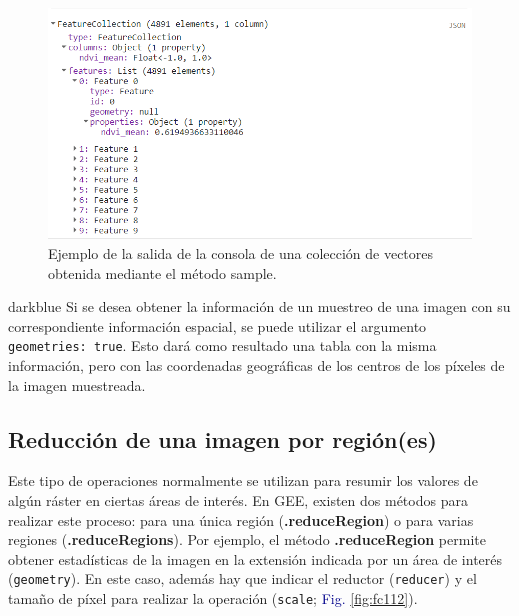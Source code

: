 \documentclass[
  12pt,
  letterpaper,
  twoside]{book}
\newcommand\boldpurple[1]{\textcolor{darkpurple}{\textbf{#1}}}
\begin{document}
\begin{figure}[H]

{\centering \includegraphics[width=0.95\linewidth]{Img/sampleRegions} 

}

\caption{Ejemplo de la salida de la consola de una colección de vectores obtenida mediante el método sample.}\label{fig:fc111}
\end{figure}

\begin{bluebox2}

\begin{awesomeblock}{5pt}{\faLightbulb}{darkblue}
Si se desea obtener la información de un muestreo de una imagen con su
correspondiente información espacial, se puede utilizar el argumento
\texttt{geometries:\ true}. Esto dará como resultado una tabla con la misma
información, pero con las coordenadas geográficas de los centros de los
píxeles de la imagen muestreada.

\end{awesomeblock}

\end{bluebox2}

\hypertarget{reducciuxf3n-de-una-imagen-por-regiuxf3nes}{%
\subsection*{Reducción de una imagen por región(es)}\label{reducciuxf3n-de-una-imagen-por-regiuxf3nes}}

  Este tipo de operaciones
normalmente se utilizan para resumir los valores de algún ráster en
ciertas áreas de interés. En GEE, existen dos métodos para realizar este
proceso: para una única región (\boldpurple{.reduceRegion}) o para varias regiones
(\boldpurple{.reduceRegions}). Por ejemplo, el método \boldpurple{.reduceRegion} permite
obtener estadísticas de la imagen en la extensión indicada por un área
de interés (\texttt{geometry}). En este caso, además hay que indicar el
reductor (\texttt{reducer}) y el tamaño de píxel para realizar la operación
(\texttt{scale}; \textcolor{darkblue}{Fig.} \ref{fig:fc112}).
\end{document}
